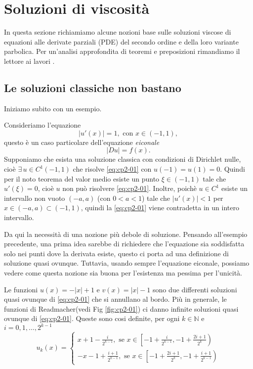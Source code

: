 \chapter{Soluzioni di viscosità}
\label{cp:cp2}
In questa sezione richiamiamo alcune nozioni base sulle soluzioni
viscose di equazioni alle derivate parziali (PDE) del secondo ordine e
della loro variante parbolica. Per un'analisi approfondita di teoremi
e preposizioni rimandiamo il lettore ai lavori \cite[][]{fed:drag,giga:main,crand:lion,yun:giga}.
%
%
%
\section{Le soluzioni classiche non bastano}
Iniziamo subito con un esempio.
\begin{esempio}
Consideriamo l'equazione
\begin{equation}
\label{eq:cp2-01}
|u'(x)| = 1,\text{ con $x\in(-1,1)$},
\end{equation}
questo è un caso particolare dell'equazione \emph{eiconale}
\[
|Du| = f(x).
\]
Supponiamo che esista una soluzione classica con condizioni di Dirichlet nulle, cioè $\exists\, u\in C^1(-1,1)$ che risolve \eqref{eq:cp2-01} con $u(-1)=u(1)=0$. Quindi per il noto teorema del valor medio esiste un punto $\xi\in (-1,1)$ tale che $u'(\xi)=0$, cioè $u$ non può risolvere \eqref{eq:cp2-01}. Inoltre, poichè $u\in C^1$ esiste un intervallo non vuoto $(-a,a)$ (con $0<a<1$) tale che $|u'(x)|<1$ per $x\in(-a,a)\subset(-1,1)$, quindi la \eqref{eq:cp2-01} viene contradetta in un intero intervallo.
\end{esempio}
Da qui la necessità di una nozione più debole di soluzione. Pensando all'esempio precedente, una prima idea sarebbe di richiedere che l'equazione sia soddisfatta solo nei punti dove la derivata esiste, questo ci porta ad una definizione di soluzione quasi ovunque. Tuttavia, usando sempre l'equazione eiconale, possiamo vedere come questa nozione sia buona per l'esistenza ma pessima per l'unicità.
\begin{esempio}
Le funzioni $u(x)=-|x|+1$ e $v(x)=|x|-1$ sono due differenti soluzioni quasi ovunque di \eqref{eq:cp2-01} che si annullano al bordo. Più in generale, le funzioni di Readmacher(vedi Fig \ref{fig:cp2-01}) ci danno infinite soluzioni quasi ovunque di \eqref{eq:cp2-01}.
Queste sono cosi definite, per ogni $k\in \mathbb{N}$ e $i=0,1,\dots,2^{k-1}$
\[
u_k(x)=
\begin{cases}
  x+1-\frac{i}{2^{k-1}},\text{ se }x\in\left[-1+\frac{i}{2^{k-1}},-1+\frac{2i+1}{2^k}\right) \\
  -x-1 +\frac{i+1}{2^{k-1}},\text{ se }x\in\left[-1+\frac{2i+1}{2^k},-1+\frac{i+1}{2^{k-1}}\right)
\end{cases}
\]
\end{esempio}
